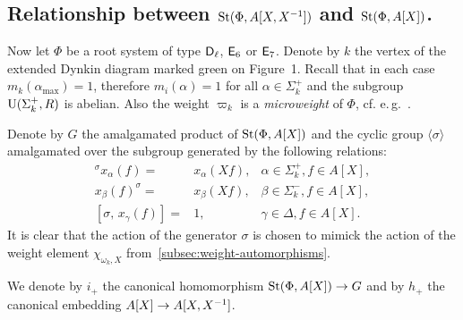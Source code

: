 \subsection{Relationship between $\operatorname{St}(\Phi, A[X, X^{-1}])$ and $\operatorname{St}(\Phi, A[X])$.} \label{subsec:short-presentation}
Now let $\Phi$ be a root system of type $\mathsf{D}_\ell$, $\mathsf{E}_6$ or $\mathsf{E}_7$.
Denote by $k$ the vertex of the extended Dynkin diagram marked green on Figure~1.
Recall that in each case $m_k(\alpha_\mathrm{\max}) = 1$, therefore $m_i(\alpha) = 1$ for all $\alpha \in \Sigma_k^+$ and the subgroup $\operatorname{U}(\Sigma^+_k, R)$ is abelian.
Also the weight $\varpi_k$ is a \textit{microweight} of $\Phi$, cf. e.\,g.~\cite[\S~2]{Ge17}.

Denote by $G$ the amalgamated product of $\operatorname{St}(\Phi, A[X])$ and the cyclic group $\langle \sigma \rangle$ amalgamated over the subgroup generated by the following relations:
\begin{align}
    {}^\sigma x_{\alpha}(f) = & x_{\alpha} (Xf), & \alpha \in \Sigma^+_k, f \in A[X], \label{eq:sigma-sigma-plus} \\
    x_{\beta}(f)^ \sigma     =& x_{\beta} (Xf), & \beta \in \Sigma^-_k, f \in A[X], \label{eq:sigma-sigma-minus} \\
    [\sigma,\, x_\gamma(f)]   =& 1, & \gamma \in \Delta, f \in A[X]. \label{eq:sigma-delta}
\end{align}
It is clear that the action of the generator $\sigma$ is chosen to mimick the action of the weight element $\chi_{\omega_k, X}$ from~\cref{subsec:weight-automorphisms}.

We denote by $i_+$ the canonical homomorphism $\operatorname{St}(\Phi, A[X]) \to G$ and by $h_+$ the canonical embedding $A[X] \to A[X, X^{-1}]$.

